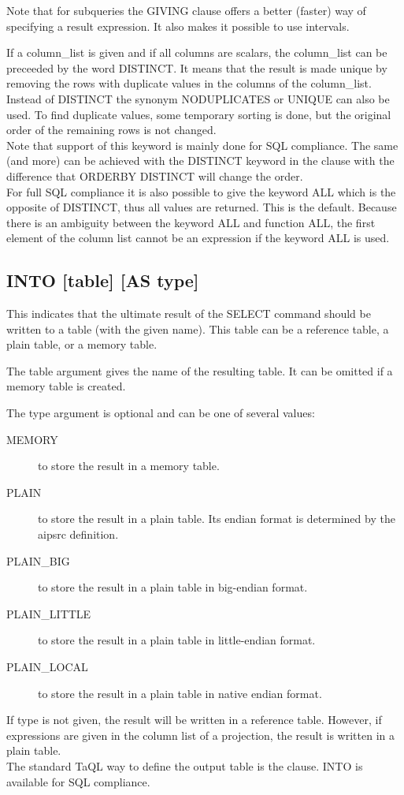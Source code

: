 Note that for subqueries the GIVING clause offers a
better (faster) way of specifying a result expression. It also makes it
possible to use intervals.

If a column\_list is given and if all columns are scalars, the
column\_list can be preceeded by the word DISTINCT.
It means that the result is made unique by removing the rows
with duplicate values in the columns of the column\_list.
Instead of DISTINCT the synonym NODUPLICATES or UNIQUE can also
be used.
To find duplicate values, some temporary sorting is done,
but the original order of the remaining rows is not changed.
\\Note that support of this keyword is mainly done for SQL
compliance. The same (and more) can be achieved with the
DISTINCT keyword in the  clause
with the difference that ORDERBY DISTINCT will change the order.
\\For full SQL compliance it is also possible to give the keyword
ALL which is the opposite of DISTINCT, thus all values are
returned. This is the default. Because there is an ambiguity between
the keyword ALL and function ALL, the first element of the column
list cannot be an expression if the keyword ALL is used.

\subsection{\label{TAQL:INTO}INTO [table] [AS type]}
This indicates that the ultimate result of the SELECT command should be
written to a table (with the given name). This table can be a
reference table, a plain table, or a memory table.

The table argument gives the name of the resulting table. It can be
omitted if a memory table is created.

The type argument is optional and can be one of several values:
\begin{description}
  \item[MEMORY ]to store the result in a memory table.
  \item[PLAIN ]to store the result in a plain table. Its endian format
is determined by the aipsrc definition.
  \item[PLAIN\_BIG ]to store the result in a plain table in big-endian format.
  \item[PLAIN\_LITTLE ]to store the result in a plain table in little-endian format.
  \item[PLAIN\_LOCAL ]to store the result in a plain table in native endian format.
\end{description}
If type is not given, the result will be written in a reference table.
However, if expressions are given in the column list of a projection,
the result is written in a plain table.
\\The standard TaQL way to define the output table is the
 clause. INTO is available
for SQL compliance.

